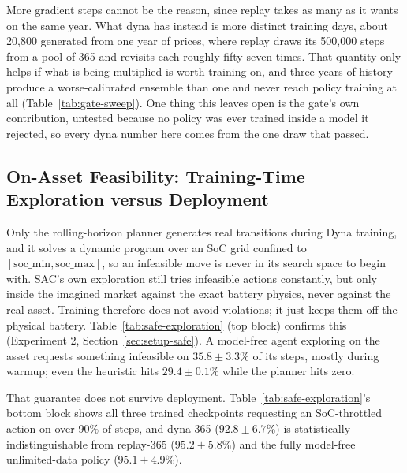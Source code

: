 \documentclass[conference]{IEEEtran}
\begin{document}
More gradient steps cannot be the reason, since replay takes as many as it wants on the same year. What dyna has instead is more distinct training days, about 20{,}800 generated from one year of prices, where replay draws its 500{,}000 steps from a pool of 365 and revisits each roughly fifty-seven times. That quantity only helps if what is being multiplied is worth training on, and three years of history produce a worse-calibrated ensemble than one and never reach policy training at all (Table~\ref{tab:gate-sweep}). One thing this leaves open is the gate's own contribution, untested because no policy was ever trained inside a model it rejected, so every dyna number here comes from the one draw that passed.

\subsection{On-Asset Feasibility: Training-Time Exploration versus Deployment}
\label{sec:results-safe}

Only the rolling-horizon planner generates real transitions during Dyna training, and it solves a dynamic program over an SoC grid confined to $[\mathrm{soc\_min}, \mathrm{soc\_max}]$, so an infeasible move is never in its search space to begin with. SAC's own exploration still tries infeasible actions constantly, but only inside the imagined market against the exact battery physics, never against the real asset. Training therefore does not avoid violations; it just keeps them off the physical battery. Table~\ref{tab:safe-exploration} (top block) confirms this (Experiment 2, Section~\ref{sec:setup-safe}). A model-free agent exploring on the asset requests something infeasible on $35.8\pm3.3\%$ of its steps, mostly during warmup; even the heuristic hits $29.4\pm0.1\%$ while the planner hits zero.

That guarantee does not survive deployment. Table~\ref{tab:safe-exploration}'s bottom block shows all three trained checkpoints requesting an SoC-throttled action on over 90\% of steps, and dyna-365 ($92.8\pm6.7\%$) is statistically indistinguishable from replay-365 ($95.2\pm5.8\%$) and the fully model-free unlimited-data policy ($95.1\pm4.9\%$).
\end{document}
